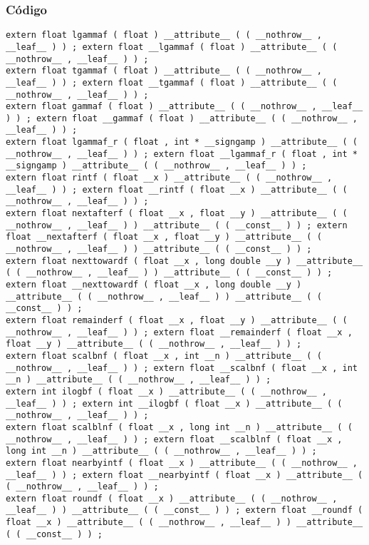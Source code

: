 \documentclass{beamer}
\begin{document}
\begin{frame}[fragile]
\frametitle{C\'odigo}
\begin{verbatim}
extern float lgammaf ( float ) __attribute__ ( ( __nothrow__ , __leaf__ ) ) ; extern float __lgammaf ( float ) __attribute__ ( ( __nothrow__ , __leaf__ ) ) ; 
extern float tgammaf ( float ) __attribute__ ( ( __nothrow__ , __leaf__ ) ) ; extern float __tgammaf ( float ) __attribute__ ( ( __nothrow__ , __leaf__ ) ) ; 
extern float gammaf ( float ) __attribute__ ( ( __nothrow__ , __leaf__ ) ) ; extern float __gammaf ( float ) __attribute__ ( ( __nothrow__ , __leaf__ ) ) ; 
extern float lgammaf_r ( float , int * __signgamp ) __attribute__ ( ( __nothrow__ , __leaf__ ) ) ; extern float __lgammaf_r ( float , int * __signgamp ) __attribute__ ( ( __nothrow__ , __leaf__ ) ) ; 
extern float rintf ( float __x ) __attribute__ ( ( __nothrow__ , __leaf__ ) ) ; extern float __rintf ( float __x ) __attribute__ ( ( __nothrow__ , __leaf__ ) ) ; 
extern float nextafterf ( float __x , float __y ) __attribute__ ( ( __nothrow__ , __leaf__ ) ) __attribute__ ( ( __const__ ) ) ; extern float __nextafterf ( float __x , float __y ) __attribute__ ( ( __nothrow__ , __leaf__ ) ) __attribute__ ( ( __const__ ) ) ; 
extern float nexttowardf ( float __x , long double __y ) __attribute__ ( ( __nothrow__ , __leaf__ ) ) __attribute__ ( ( __const__ ) ) ; extern float __nexttowardf ( float __x , long double __y ) __attribute__ ( ( __nothrow__ , __leaf__ ) ) __attribute__ ( ( __const__ ) ) ; 
extern float remainderf ( float __x , float __y ) __attribute__ ( ( __nothrow__ , __leaf__ ) ) ; extern float __remainderf ( float __x , float __y ) __attribute__ ( ( __nothrow__ , __leaf__ ) ) ; 
extern float scalbnf ( float __x , int __n ) __attribute__ ( ( __nothrow__ , __leaf__ ) ) ; extern float __scalbnf ( float __x , int __n ) __attribute__ ( ( __nothrow__ , __leaf__ ) ) ; 
extern int ilogbf ( float __x ) __attribute__ ( ( __nothrow__ , __leaf__ ) ) ; extern int __ilogbf ( float __x ) __attribute__ ( ( __nothrow__ , __leaf__ ) ) ; 
extern float scalblnf ( float __x , long int __n ) __attribute__ ( ( __nothrow__ , __leaf__ ) ) ; extern float __scalblnf ( float __x , long int __n ) __attribute__ ( ( __nothrow__ , __leaf__ ) ) ; 
extern float nearbyintf ( float __x ) __attribute__ ( ( __nothrow__ , __leaf__ ) ) ; extern float __nearbyintf ( float __x ) __attribute__ ( ( __nothrow__ , __leaf__ ) ) ; 
extern float roundf ( float __x ) __attribute__ ( ( __nothrow__ , __leaf__ ) ) __attribute__ ( ( __const__ ) ) ; extern float __roundf ( float __x ) __attribute__ ( ( __nothrow__ , __leaf__ ) ) __attribute__ ( ( __const__ ) ) ; 
\end{verbatim}
\end{frame}
\end{document}
